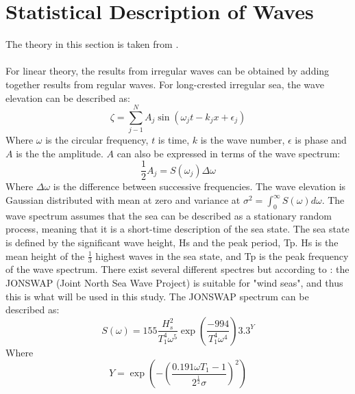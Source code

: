 \section{Statistical Description of Waves} 
 The theory in this section is taken from \cite{Faltinsen1990}.\\\\ For linear theory, the results from irregular waves can be obtained by adding together results from regular waves. For long-crested irregular sea, the wave elevation can be described as:
\begin{equation}
    \zeta = \sum_{j-1}^N A_j \sin(\omega_jt-k_jx+\epsilon_j)
    \label{eq:elevation}
\end{equation}
Where $\omega$ is the circular frequency, $t$ is time, $k$ is the wave number, $\epsilon$ is phase and $A$ is the the amplitude. $A$ can also be expressed in terms of the wave spectrum:
\begin{equation}
    \frac{1}{2}A_j=S(\omega_j) \Delta \omega
\end{equation}
Where $\Delta \omega$ is the difference between successive frequencies. The wave elevation is Gaussian distributed with mean at zero and variance at $\sigma^2= \int_0 ^ \infty S(\omega) d\omega $. The wave spectrum assumes that the sea can be described as a stationary random process, meaning that it is a short-time description of the sea state. The sea state is defined by the significant wave height, Hs and the peak period, Tp. Hs is the mean height of the $\frac{1}{3}$ highest waves in the sea state, and Tp is the peak frequency of the wave spectrum. There exist several different spectres but according to \cite{Lifes50+D1.1}: the JONSWAP (Joint North Sea Wave Project) is suitable for "wind seas", and thus this is what will be used in this study. The JONSWAP spectrum can be described as:
\begin{equation}
    S(\omega)=155 \frac{H_s^2}{T_1^4 \omega ^5} \exp{(\frac{-994}{T_1^4 \omega ^4})} 3.3^Y
\end{equation}
Where
\begin{equation}
    Y= \exp \left(-\left( \frac{0.191 \omega T_1 -1}{2^\frac{1}{2} \sigma} \right)^2\right)
\end{equation}

